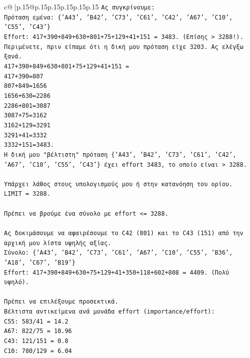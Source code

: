 \documentclass{article}
\begin{document}
{\begin{supertabular}{c@{$\;$}|p{.15\linewidth}@{}p{.15\linewidth}p{.15\linewidth}p{.15\linewidth}p{.15\linewidth}p{.15\linewidth}}
{{{\texttt{Ας συγκρίνουμε:} \\
\texttt{Πρόταση εμένα: \{'A43', 'B42', 'C73', 'C61', 'C42', 'A67', 'C10', 'C55', 'C43'\}} \\
\texttt{Effort: 417+390+849+630+801+75+129+41+151 = 3483. (Επίσης > 3288!).} \\
\texttt{Περιμένετε, πριν είπαμε ότι η δική μου πρόταση είχε 3203. Ας ελέγξω ξανά.} \\
\texttt{417+390+849+630+801+75+129+41+151 = } \\
\texttt{417+390=807} \\
\texttt{807+849=1656} \\
\texttt{1656+630=2286} \\
\texttt{2286+801=3087} \\
\texttt{3087+75=3162} \\
\texttt{3162+129=3291} \\
\texttt{3291+41=3332} \\
\texttt{3332+151=3483.} \\
\texttt{Η δική μου "βέλτιστη" πρόταση \{'A43', 'B42', 'C73', 'C61', 'C42', 'A67', 'C10', 'C55', 'C43'\} έχει effort 3483, το οποίο είναι > 3288.} \\
\\ 
\texttt{Υπάρχει λάθος στους υπολογισμούς μου ή στην κατανόηση του ορίου.} \\
\texttt{LIMIT = 3288.} \\
\\ 
\texttt{Πρέπει να βρούμε ένα σύνολο με effort <= 3288.} \\
\\ 
\texttt{Ας δοκιμάσουμε να αφαιρέσουμε το C42 (801) και το C43 (151) από την αρχική μου λίστα υψηλής αξίας.} \\
\texttt{Σύνολο: \{'A43', 'B42', 'C73', 'C61', 'A67', 'C10', 'C55', 'B36', 'A18', 'C67', 'B19'\}} \\
\texttt{Effort: 417+390+849+630+75+129+41+350+118+602+808 = 4409. (Πολύ υψηλό).} \\
\\ 
\texttt{Πρέπει να επιλέξουμε προσεκτικά.} \\
\texttt{Βέλτιστα αντικείμενα ανά μονάδα effort (importance/effort):} \\
\texttt{C55: 583/41 = 14.2} \\
\texttt{A67: 822/75 = 10.96} \\
\texttt{C43: 121/151 = 0.8} \\
\texttt{C10: 780/129 = 6.04} \\
}}}
\end{supertabular}}
\end{document}
